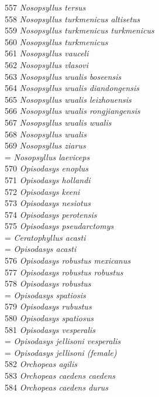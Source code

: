 \documentclass[
]{article}
\begin{document}
557 \emph{Nosopsyllus tersus}\\
558 \emph{Nosopsyllus turkmenicus altisetus}\\
559 \emph{Nosopsyllus turkmenicus turkmenicus}\\
560 \emph{Nosopsyllus turkmenicus}\\
561 \emph{Nosopsyllus vauceli}\\
562 \emph{Nosopsyllus vlasovi}\\
563 \emph{Nosopsyllus wualis boseensis}\\
564 \emph{Nosopsyllus wualis diandongensis}\\
565 \emph{Nosopsyllus wualis leizhouensis}\\
566 \emph{Nosopsyllus wualis rongjiangensis}\\
567 \emph{Nosopsyllus wualis wualis}\\
568 \emph{Nosopsyllus wualis}\\
569 \emph{Nosopsyllus ziarus}\\
= \emph{Nosopsyllus laeviceps}\\
570 \emph{Opisodasys enoplus}\\
571 \emph{Opisodasys hollandi}\\
572 \emph{Opisodasys keeni}\\
573 \emph{Opisodasys nesiotus}\\
574 \emph{Opisodasys perotensis}\\
575 \emph{Opisodasys pseudarctomys}\\
= \emph{Ceratophyllus acasti}\\
= \emph{Opisodasys acasti}\\
576 \emph{Opisodasys robustus mexicanus}\\
577 \emph{Opisodasys robustus robustus}\\
578 \emph{Opisodasys robustus}\\
= \emph{Opisodasys spatiosis}\\
579 \emph{Opisodasys rubustus}\\
580 \emph{Opisodasys spatiosus}\\
581 \emph{Opisodasys vesperalis}\\
= \emph{Opisodasys jellisoni vesperalis}\\
= \emph{Opisodasys jellisoni (female)}\\
582 \emph{Orchopeas agilis}\\
583 \emph{Orchopeas caedens caedens}\\
584 \emph{Orchopeas caedens durus}\\
\end{document}
